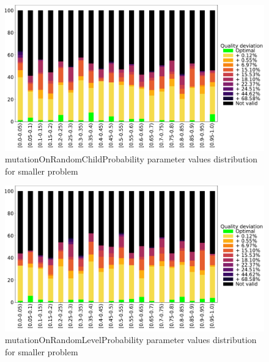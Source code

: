 \begin{figure}
	\centering
	\includegraphics[width=\textwidth]{images/DistrObj/mutationOnRandomChildProbability.pdf}
	\caption[mutationOnRandomChildProbability parameter values distribution for smaller problem]{mutationOnRandomChildProbability parameter values distribution for smaller problem}
	\label{fig:mutationOnRandomChildProbability_Obj}
\end{figure}

\begin{figure}
	\centering
	\includegraphics[width=\textwidth]{images/DistrObj/mutationOnRandomLevelProbability.pdf}
	\caption[mutationOnRandomLevelProbability parameter values distribution for smaller problem]{mutationOnRandomLevelProbability parameter values distribution for smaller problem}
	\label{fig:mutationOnRandomLevelProbability_Obj}
\end{figure}

